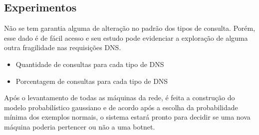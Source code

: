 \subsection{Experimentos}

Não se tem garantia alguma de alteração no padrão dos tipos de consulta. Porém, esse dado é de fácil acesso e seu estudo pode evidenciar a exploração de alguma outra fragilidade nas requisições DNS.

\begin{itemize}
\item Quantidade de consultas para cada tipo de DNS
\item Porcentagem de consultas para cada tipo de DNS
\end{itemize}

Após o levantamento de todas as máquinas da rede, é feita a construção do modelo probabilístico gaussiano e de acordo após a escolha da probabilidade mínima dos exemplos normais, o sistema estará pronto para decidir se uma nova máquina poderia pertencer ou não a uma botnet.
